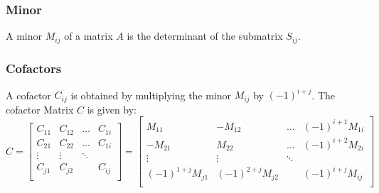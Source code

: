 \subsubsection{Minor}
A minor \(M_{ij}\) of a matrix \(A\) is the determinant of the submatrix \(S_{ij}\).
\subsubsection{Cofactors}
A cofactor \( C_{ij} \) is obtained by multiplying the minor \( M_{ij} \) by \( (-1)^{i + j} \). The cofactor Matrix \(C \) is given by:
\begin{equation}
    C = \begin{bmatrix}
        C_{11} & C_{12} & \dots  & C_{1i} \\
        C_{21} & C_{22} & \dots  & C_{1i} \\
        \vdots & \vdots & \ddots          \\
        C_{j1} & C_{j2} &        & C_{ij} \\
    \end{bmatrix} =  \begin{bmatrix}
        M_{11}            & -M_{12}             & \dots  & (-1)^{i + 1}M_{1i}  \\
        -M_{21}           & M_{22}              & \dots  & (-1)^{i + 2} M_{2i} \\
        \vdots            & \vdots              & \ddots                       \\
        (-1)^{1+ j}M_{j1} & (-1)^{2 + j} M_{j2} &        & (-1)^{i + j} M_{ij} \\
    \end{bmatrix}
\end{equation}
